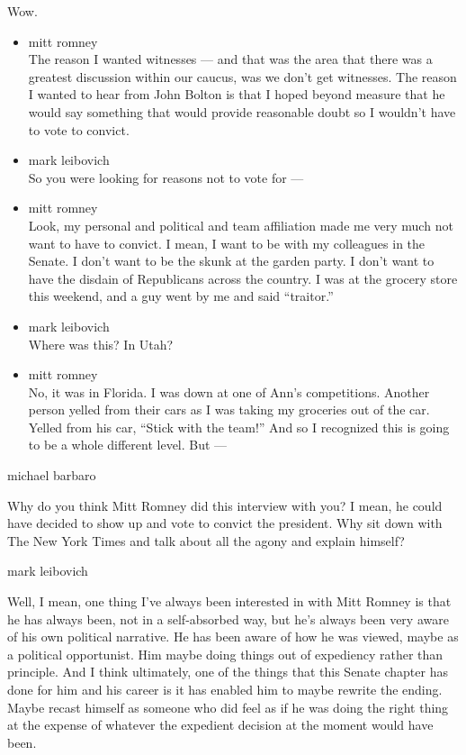 Wow.

\begin{itemize}
\item
  mitt romney\\
  The reason I wanted witnesses --- and that was the area that there was
  a greatest discussion within our caucus, was we don't get witnesses.
  The reason I wanted to hear from John Bolton is that I hoped beyond
  measure that he would say something that would provide reasonable
  doubt so I wouldn't have to vote to convict.
\item
  mark leibovich\\
  So you were looking for reasons not to vote for ---
\item
  mitt romney\\
  Look, my personal and political and team affiliation made me very much
  not want to have to convict. I mean, I want to be with my colleagues
  in the Senate. I don't want to be the skunk at the garden party. I
  don't want to have the disdain of Republicans across the country. I
  was at the grocery store this weekend, and a guy went by me and said
  ``traitor.''
\item
  mark leibovich\\
  Where was this? In Utah?
\item
  mitt romney\\
  No, it was in Florida. I was down at one of Ann's competitions.
  Another person yelled from their cars as I was taking my groceries out
  of the car. Yelled from his car, ``Stick with the team!'' And so I
  recognized this is going to be a whole different level. But ---
\end{itemize}

michael barbaro

Why do you think Mitt Romney did this interview with you? I mean, he
could have decided to show up and vote to convict the president. Why sit
down with The New York Times and talk about all the agony and explain
himself?

mark leibovich

Well, I mean, one thing I've always been interested in with Mitt Romney
is that he has always been, not in a self-absorbed way, but he's always
been very aware of his own political narrative. He has been aware of how
he was viewed, maybe as a political opportunist. Him maybe doing things
out of expediency rather than principle. And I think ultimately, one of
the things that this Senate chapter has done for him and his career is
it has enabled him to maybe rewrite the ending. Maybe recast himself as
someone who did feel as if he was doing the right thing at the expense
of whatever the expedient decision at the moment would have been.

